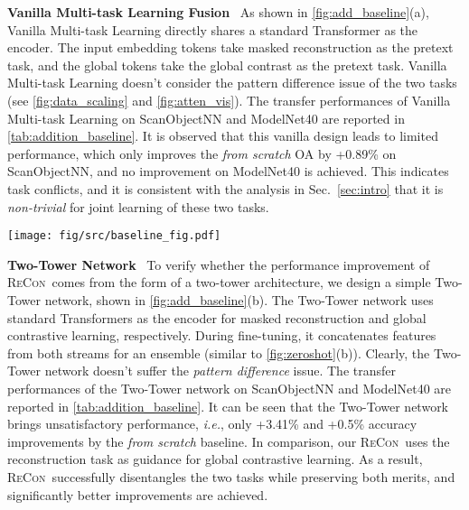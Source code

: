\documentclass{article}
\theoremstyle{plain}
\theoremstyle{definition}
\theoremstyle{remark}
\def\ie{{\it{i.e.}}}
\def\recon{{\scshape ReCon}}
\begin{document}
\textbf{Vanilla Multi-task Learning Fusion}~
As shown in \cref{fig:add_baseline}(a), Vanilla Multi-task Learning directly shares a standard Transformer as the encoder. The input embedding tokens take masked reconstruction as the pretext task, and the global tokens take the global contrast as the pretext task. Vanilla Multi-task Learning doesn't consider the pattern difference issue of the two tasks (see \cref{fig:data_scaling} and \cref{fig:atten_vis}). The transfer performances of Vanilla Multi-task Learning on ScanObjectNN and ModelNet40 are reported in \cref{tab:addition_baseline}. It is observed that this vanilla design leads to limited performance, which only improves the \textit{from scratch} OA by +0.89\% on ScanObjectNN, and no improvement on ModelNet40 is achieved.
This indicates task conflicts, and it is consistent with the analysis in Sec.~\ref{sec:intro} that it is \textit{non-trivial} for joint learning of these two tasks.
\begin{figure*}[t!]
    \begin{center}
    \texttt{[image: fig/src/baseline\_fig.pdf]}
    \vspace{-15pt}
    \caption{\textbf{Illustration of the vanilla multi-task learning and two-tower network baselines}.
    }\label{fig:add_baseline} 
    \end{center}
\end{figure*} 
\textbf{Two-Tower Network}~
To verify whether the performance improvement of \recon\ comes from the form of a two-tower architecture, we design a simple Two-Tower network, shown in \cref{fig:add_baseline}(b). The Two-Tower network uses standard Transformers as the encoder for masked reconstruction and global contrastive learning, respectively.
During fine-tuning, it concatenates features from both streams for an ensemble (similar to \cref{fig:zeroshot}(b)). 
Clearly, the Two-Tower network doesn't suffer the \textit{pattern difference} issue.
The transfer performances of the Two-Tower network on ScanObjectNN and ModelNet40 are reported in \cref{tab:addition_baseline}. It can be seen that the Two-Tower network brings unsatisfactory performance, \ie, only +3.41\% and +0.5\% accuracy improvements by the \textit{from scratch} baseline. 
In comparison, our \recon\ uses the reconstruction task as guidance for global contrastive learning. 
As a result, \recon\ successfully disentangles the two tasks while preserving both merits, and significantly better improvements are achieved.
\end{document}
